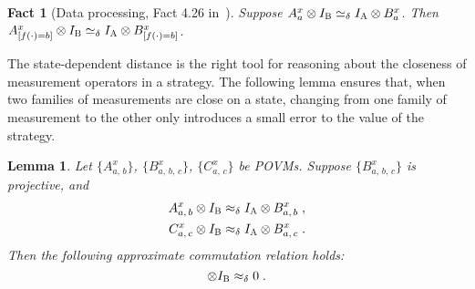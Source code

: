 \documentclass[11pt]{article}
\newtheorem{lemma}[theorem]{Lemma}
\newtheorem{fact}[theorem]{Fact}
\theoremstyle{definition}
\newcommand{\Id}{\ensuremath{I}}
\newcommand{\labelstyle}[1]{\ensuremath{\textsc{#1}}\xspace}
\newcommand{\alice}{\labelstyle{A}}
\newcommand{\bob}{\labelstyle{B}}
\newcommand{\abc}[1][\delta]{\otimes I_\bob \simeq_{#1} I_\alice \otimes}
\begin{document}
\begin{fact}[Data processing, Fact 4.26 in~\cite{NW19}]
  \label{fact:data-processing}
  Suppose $A^x_a \abc B^x_a$.
  Then $A^x_{[f(\cdot) = b]} \abc B^x_{[f(\cdot) = b]}$.
\end{fact}


The state-dependent distance is the right tool for reasoning about the closeness
of measurement operators in a strategy.
The following lemma ensures that, when two families of measurements are close on a
state, changing from one family of measurement to the other only introduces
a small error to the value of the strategy.

\begin{lemma}
  \label{lem:commutation-analysis}
Let $\{A^x_{a,\, b}\}$, $\{B^x_{a,\, b,\, c}\}$, $\{C^x_{a,\, c}\}$ be POVMs. Suppose $\{B^x_{a,\, b,\, c}\}$ is projective, and
  \begin{align*}
    A^x_{a,\, b} \otimes \Id_\bob &\approx_\delta \Id_\alice \otimes B^x_{a,\, b}\;,\\
    C^x_{a,\, c} \otimes \Id_\bob &\approx_\delta \Id_\alice \otimes B^x_{a,\, c}\;.
  \end{align*}
  Then the following approximate commutation relation holds:
  \begin{equation*}
    [A^x_{a,\, b}, C^x_{a,\, c}] \otimes I_\bob \approx_\delta 0\;.
  \end{equation*}
\end{lemma}
\end{document}
